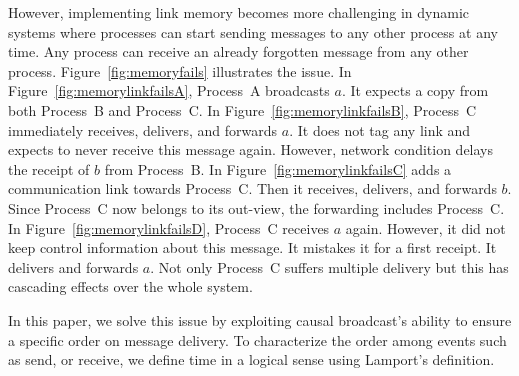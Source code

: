 However, implementing link memory becomes more challenging in dynamic systems
where processes can start sending messages to any other process at any time. Any
process can receive an already forgotten message from any other
process. Figure~\ref{fig:memoryfails} illustrates the issue. In
Figure~\ref{fig:memorylinkfailsA}, Process~A broadcasts $a$. It expects a copy
from both Process~B and Process~C. In Figure~\ref{fig:memorylinkfailsB},
Process~C immediately receives, delivers, and forwards $a$. It does not tag any
link and expects to never receive this message again. However, network condition
delays the receipt of $b$ from Process~B. In Figure~\ref{fig:memorylinkfailsC}
adds a communication link towards Process~C. Then it receives, delivers, and
forwards $b$. Since Process~C now belongs to its out-view, the forwarding
includes Process~C. In Figure~\ref{fig:memorylinkfailsD}, Process~C receives $a$
again. However, it did not keep control information about this message. It
mistakes it for a first receipt. It delivers and forwards $a$. Not only
Process~C suffers multiple delivery but this has cascading effects over the
whole system.

In this paper, we solve this issue by exploiting causal broadcast's ability to
ensure a specific order on message delivery. To characterize the order among
events such as send, or receive, we define time in a logical sense using
Lamport’s definition.






